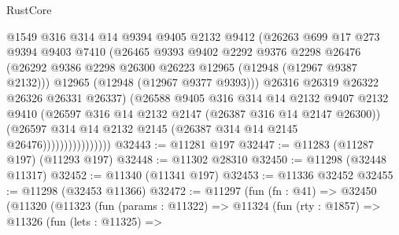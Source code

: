 \begin{lexlean}{RustCore}
\begin{coremodule}
                              @1549
                              @316
                              @314
                              @14
                              @9394
                              @9405
                              @2132
                              @9412
                              (@26263
                                @699
                                @17
                                @273
                                @9394
                                @9403
                                @7410
                                (@26465
                                  @9393
                                  @9402
                                  @2292
                                  @9376
                                  @2298
                                  @26476
                                  (@26292
                                    @9386
                                    @2298
                                    @26300
                                    @26223
                                    @12965
                                    (@12948 (@12967 @9387 @2132)))
                                  @12965
                                  (@12948 (@12967 @9377 @9393)))
                                @26316
                                @26319
                                @26322
                                @26326
                                @26331
                                @26337)
                              (@26588
                                @9405
                                @316
                                @314
                                @14
                                @2132
                                @9407
                                @2132
                                @9410
                                (@26597 @316 @14 @2132 @2147 (@26387 @316 @14 @2147 @26300))
                                (@26597
                                  @314
                                  @14
                                  @2132
                                  @2145
                                  (@26387 @314 @14 @2145 @26476))))))))))))))))
@32443 := @11281 @197
@32447 := @11283 (@11287 @197) (@11293 @197)
@32448 := @11302 @28310
@32450 := @11298 (@32448 @11317)
@32452 := @11340 (@11341 @197)
@32453 := @11336 @32452
@32455 := @11298 (@32453 @11366)
@32472 := @11297
    (fun (fn : @41) =>
    @32450
      (@11320
        (@11323
          (fun (params : @11322) =>
          @11324
            (fun (rty : @1857) =>
            @11326
              (fun (lets : @11325) =>

\end{coremodule}
\end{lexlean}

